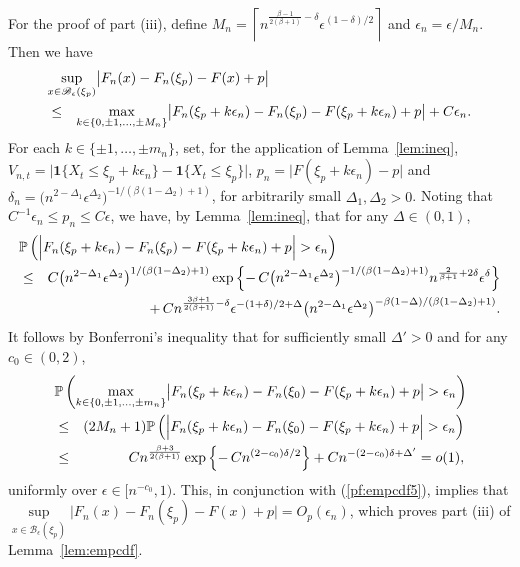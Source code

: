 \documentclass[a4paper, 12pt]{article}
\theoremstyle{plain}
\theoremstyle{definition}
\newcommand{\prob}{{\Bbb P}}
\begin{document}
For the proof of part (iii), define $M_n=\left\lceil n^{\frac{\beta-1}{2(\beta+1)}-\delta}\epsilon^{(1-\delta)/2}\right\rceil$ and $\epsilon_n=\epsilon/M_n$.
Then we have
\begin{eqnarray}
\lefteqn{
\underset{x\in\mathscr{B}_\epsilon(\xi_p)}\sup
\big|F_n(x)-F_n(\xi_p)-F(x)+p\big|}\nonumber\\
&\le& \underset{k\in\{0,\pm 1,\ldots,\pm M_n\}}
\max\big|F_n(\xi_p+k\epsilon_n)-F_n(\xi_p)-F(\xi_p+k\epsilon_n)+p\big|+C\epsilon_n.
\label{pf:empcdf5}
\end{eqnarray}
For each $k\in\{\pm 1,\ldots,\pm m_n\}$, set, for the application of
Lemma~\ref{lem:ineq},
$V_{n,t}=\big|\pmb{1}\{X_t\le\xi_p+k\epsilon_n\}-\pmb{1}\{X_t\le\xi_p\}\big|$,
$p_n=\big|F(\xi_p+k\epsilon_n)-p\big|$ and
$\delta_n=\big(n^{2-\Delta_1}\epsilon^{\Delta_2}\big)^{-1/(\beta(1-\Delta_2)+1)}$,
for arbitrarily small $\Delta_1,\Delta_2>0$. Noting that
$C^{-1}\epsilon_n\le p_n\le C\epsilon$, we have, by Lemma~\ref{lem:ineq},
that for any $\Delta\in(0,1)$,
\begin{eqnarray*}
\lefteqn{\prob\left(\Big|
F_n(\xi_p+k\epsilon_n)-F_n(\xi_p)-F(\xi_p+k\epsilon_n)+p\Big|>\epsilon_n\right)}\nonumber\\
&\le& C
\big(n^{2-\Delta_1}\epsilon^{\Delta_2}\big)^{1/(\beta(1-\Delta_2)+1)}
\exp\left\{-\,C\big(n^{2-\Delta_1}\epsilon^{\Delta_2}\big)^{-1/(\beta(1-\Delta_2)+1)}n^{\frac{2}{\beta+1}+2\delta}\epsilon^{\delta}\right\}\\
&&+\,Cn^{\frac{3\beta+1}{2(\beta+1)}-\delta}\epsilon^{-(1+\delta)/2+\Delta}
\big(n^{2-\Delta_1}\epsilon^{\Delta_2}\big)^{-\beta(1-\Delta)/(\beta(1-\Delta_2)+1)}.
\end{eqnarray*}
It follows by Bonferroni's inequality that for sufficiently small $\Delta'>0$ and
for any $c_0\in(0,2)$,
\begin{eqnarray*}
\lefteqn{\prob\left(\underset{k\in\{0,\pm 1,\ldots,\pm m_n\}}
\max\big|F_n(\xi_p+k\epsilon_n)-F_n(\xi_0)-
F(\xi_p+k\epsilon_n)+p\big|>\epsilon_n\right)}\nonumber\\
&\le&(2M_n+1)
\prob\left(\Big|
F_n(\xi_p+k\epsilon_n)-F_n(\xi_0)-
F(\xi_p+k\epsilon_n)+p\Big|>\epsilon_n\right)\\
&\le&
Cn^{\frac{\beta+3}{2 (\beta+1)}}
\exp\left\{-\,Cn^{(2-c_0)\delta/2}
\right\}+Cn^{-(2-c_0)\delta+\Delta'}=o(1),
\end{eqnarray*}
uniformly over $\epsilon\in\big[n^{-c_0},1\big)$.
This, in conjunction with (\ref{pf:empcdf5}), implies  that
$\underset{x\in\mathscr{B}_\epsilon(\xi_p)}\sup
\big|F_n(x)-F_n(\xi_p)-F(x)+p\big|=O_p(\epsilon_n)$, which proves part (iii) of
Lemma~\ref{lem:empcdf}.
\end{document}

